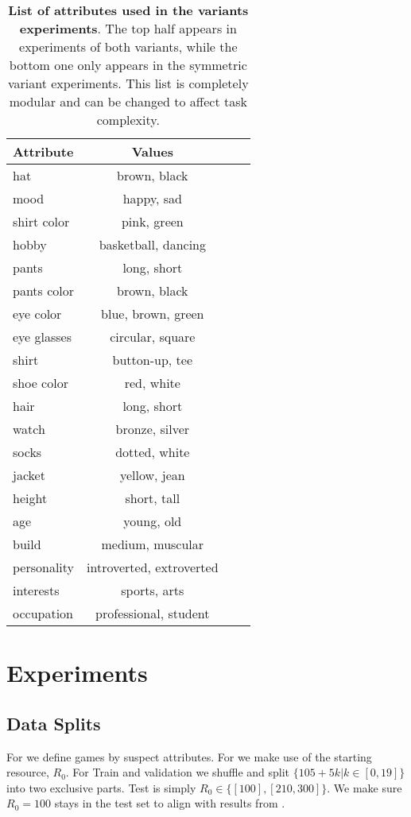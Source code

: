 \begin{table}[t]
  \centering
  \footnotesize 
  \begin{tabular}{lccc}
    \toprule
    \textbf{Attribute} & \textbf{Values} \\
    \midrule
    hat & brown, black \\
    mood & happy, sad \\
    shirt color & pink, green \\
    hobby & basketball, dancing \\
    pants & long, short \\
    pants color & brown, black \\
    eye color & blue, brown, green \\
    eye glasses & circular, square \\
    shirt & button-up, tee \\
    shoe color & red, white \\
    hair & long, short \\
    watch & bronze, silver \\
    \midrule
    socks & dotted, white \\
    jacket & yellow, jean \\
    height & short, tall \\
    age & young, old \\
    build & medium, muscular \\
    personality & introverted, extroverted \\
    interests & sports, arts \\
    occupation & professional, student \\
    \bottomrule
  \end{tabular}

  \caption{\textbf{List of attributes used in the \ourenv{} variants experiments}. The top half appears in experiments of both variants, while the bottom one only appears in the symmetric variant experiments. This list is completely modular and can be changed to affect task complexity.}
  \label{tab:attributes}
\end{table}



\section{Experiments}
\subsection{Data Splits}
\label{app:datasplits}
For \ourenv{} we define games by suspect attributes. For \govsim{} we make use of the starting resource, $R_0$. For Train and validation we shuffle and split $\{105 + 5k | k\in [0, 19]\}$ into two exclusive parts. Test is simply $R_0\in \{[100], [210,300]\}$. We make sure $R_0=100$ stays in the test set to align with results from \cite{piatti2024cooperate}.

